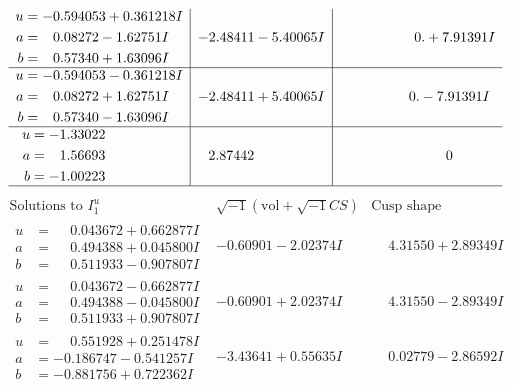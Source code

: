 \documentclass[1p]{elsarticle_modified}
\theoremstyle{definition}
\newcommand{\I}{\sqrt{-1}}
\begin{document}
$$\begin{array}{c|c|c}
\begin{aligned}
u &= -0.594053 + 0.361218 I \\
a &= \phantom{-}0.08272 - 1.62751 I \\
b &= \phantom{-}0.57340 + 1.63096 I\end{aligned}
 & -2.48411 - 5.40065 I & \phantom{-0.000000 -}0. + 7.91391 I \\ \hline\begin{aligned}
u &= -0.594053 - 0.361218 I \\
a &= \phantom{-}0.08272 + 1.62751 I \\
b &= \phantom{-}0.57340 - 1.63096 I\end{aligned}
 & -2.48411 + 5.40065 I & \phantom{-0.000000 } 0. - 7.91391 I \\ \hline\begin{aligned}
u &= -1.33022\phantom{ +0.000000I} \\
a &= \phantom{-}1.56693\phantom{ +0.000000I} \\
b &= -1.00223\phantom{ +0.000000I}\end{aligned}
 & \phantom{-}2.87442\phantom{ +0.000000I} & \phantom{-0.000000 } 0\\
 \hline 
 \end{array}$$\newpage$$\begin{array}{c|c|c}  
\text{Solutions to }I^u_{1}& \I (\text{vol} + \sqrt{-1}CS) & \text{Cusp shape}\\
 \hline 
\begin{aligned}
u &= \phantom{-}0.043672 + 0.662877 I \\
a &= \phantom{-}0.494388 + 0.045800 I \\
b &= \phantom{-}0.511933 - 0.907807 I\end{aligned}
 & -0.60901 - 2.02374 I & \phantom{-}4.31550 + 2.89349 I \\ \hline\begin{aligned}
u &= \phantom{-}0.043672 - 0.662877 I \\
a &= \phantom{-}0.494388 - 0.045800 I \\
b &= \phantom{-}0.511933 + 0.907807 I\end{aligned}
 & -0.60901 + 2.02374 I & \phantom{-}4.31550 - 2.89349 I \\ \hline\begin{aligned}
u &= \phantom{-}0.551928 + 0.251478 I \\
a &= -0.186747 - 0.541257 I \\
b &= -0.881756 + 0.722362 I\end{aligned}
 & -3.43641 + 0.55635 I & \phantom{-}0.02779 - 2.86592 I \\ \hline\begin{aligned}

\end{aligned}
\end{array}$$
\end{document}
